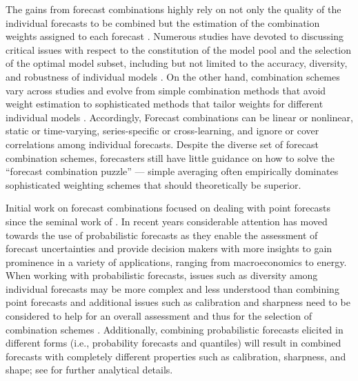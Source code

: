\documentclass[11pt]{article}
\begin{document}
The gains from forecast combinations highly rely on not only the quality of the individual forecasts to be combined but the estimation of the combination weights assigned to each forecast \citep{Timmermann2006-en,Cang2014-tp}. Numerous studies have devoted to discussing critical issues with respect to the constitution of the model pool and the selection of the optimal model subset, including but not limited to the accuracy, diversity, and robustness of individual models \citep{Batchelor1995-ps,Mannes2014-dl,Thomson2019-al,Lichtendahl2020-ut,Kang2021-ol}. On the other hand, combination schemes vary across studies and evolve from simple combination methods that avoid weight estimation \citep[e.g.,][]{Clemen1986-pd,Palm1992-im,Genre2013-ut,Grushka-Cockayne2017-dj,Petropoulos2020-fp} to sophisticated methods that tailor weights for different individual models \citep[e.g.,][]{Bates1969-yj,Newbold1974-lp,Kolassa2011-ai,Li2020-od,Montero-Manso2020-tq,Kang2021-ol,Wang2021-un}. Accordingly, Forecast combinations can be linear or nonlinear, static or time-varying, series-specific or cross-learning, and ignore or cover correlations among individual forecasts. Despite the diverse set of forecast combination schemes, forecasters still have little guidance on how to solve the ``forecast combination puzzle'' \citep{Stock2004-rq,Smith2009-wd,Claeskens2016-pv,Chan2018-jl} --- simple averaging often empirically dominates sophisticated weighting schemes that should theoretically be superior.

Initial work on forecast combinations focused on dealing with point forecasts since the seminal work of \citet{Bates1969-yj} \citep[see, for example,][]{Clemen1989-fb,Timmermann2006-en}. In recent years considerable attention has moved towards the use of probabilistic forecasts \citep[e.g.,][]{Hall2007-lh,Gneiting2013-hl,Kapetanios2015-bb,Martin2021-yi} as they enable the assessment of forecast uncertainties and provide decision makers with more insights to gain prominence in a variety of applications, ranging from macroeconomics to energy. When working with probabilistic forecasts, issues such as diversity among individual forecasts may be more complex and less understood than combining point forecasts \citep{Ranjan2010-jl} and additional issues such as calibration and sharpness need to be considered to help for an overall assessment and thus for the selection of combination schemes \citep{Gneiting2007-fr}. Additionally, combining probabilistic forecasts elicited in different forms (i.e., probability forecasts and quantiles) will result in combined forecasts with completely different properties such as calibration, sharpness, and shape; see \citet{Lichtendahl2013-rt} for further analytical details.
\end{document}
